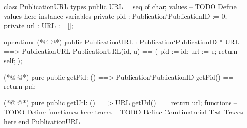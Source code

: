 \begin{vdmpp}[breaklines=true]
class PublicationURL
types
public URL = seq of char;
values
-- TODO Define values here
instance variables
 private pid : Publication`PublicationID := 0;
 private url : URL := [];
 
operations
(*@
\label{PublicationURL:11}
@*)
 public PublicationURL : Publication`PublicationID * URL  ==> PublicationURL
  PublicationURL(id, u) ==
  (
   pid := id;
   url := u;
   return self;
  );
  
(*@
\label{getPid:19}
@*)
  pure public getPid: () ==> Publication`PublicationID
   getPid() == return pid;
   
(*@
\label{getUrl:22}
@*)
  pure public getUrl: () ==> URL
   getUrl() == return url;
functions
-- TODO Define functiones here
traces
-- TODO Define Combinatorial Test Traces here
end PublicationURL
\end{vdmpp}
